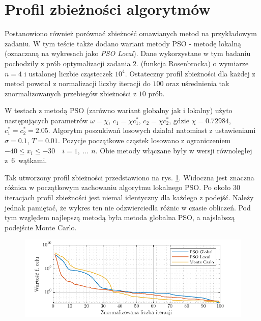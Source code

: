 \documentclass[11pt, a4paper, oneside]{article}
\begin{document}
\section{Profil zbieżności algorytmów}

Postanowiono również porównać zbieżność omawianych metod na przykładowym zadaniu. W tym teście także dodano wariant metody PSO - metodę lokalną (oznaczaną na wykresach jako \textit{PSO Local}). Dane wykorzystane w tym badaniu pochodziły z prób optymalizacji zadania $2.$ (funkcja Rosenbrocka) o wymiarze $n = 4$ i ustalonej liczbie cząsteczek $10^{4}$. Ostateczny profil zbieżności dla każdej z metod powstał z normalizacji liczby iteracji do $100$ oraz uśrednienia tak znormalizowanych przebiegów zbieżności z $10$ prób.

W testach z metodą PSO (zarówno wariant globalny jak i lokalny) użyto następujących parametrów $\omega = \chi$, $c_1 = \chi c_1^*$, $c_2 = \chi c_2^*$, gdzie $\chi = 0.72984$, $c_1^* = c_2^* = 2.05$. Algorytm poszukiwań losowych działał natomiast z ustawieniami $\sigma = 0.1$, $T = 0.01$. Pozycje początkowe cząstek losowano z ograniczeniem $-40 \leq x_i \leq -30 \quad i = 1, \ ...\, \ n$. Obie metody włączane były w wersji równoległej z~$6$~wątkami.

Tak utworzony profil zbieżności przedstawiono na rys. \ref{fig:zbieznosc}. Widoczna jest znaczna różnica w początkowym zachowaniu algorytmu lokalnego PSO. Po około $30$ iteracjach profil zbieżności jest niemal identyczny dla każdego z podejść. Należy jednak pamiętać, że wykres ten nie odzwierciedla różnic w czasie obliczeń. Pod tym względem najlepszą metodą była metoda globalna PSO, a najsłabszą podejście Monte Carlo.

\begin{figure}[h]
\centerline{\includegraphics[width=\dimexpr.9\textwidth-1em]{grafiki/zbieznosc_porownanie.pdf}}
\label{fig:zbieznosc}
\end{figure}
\end{document}
